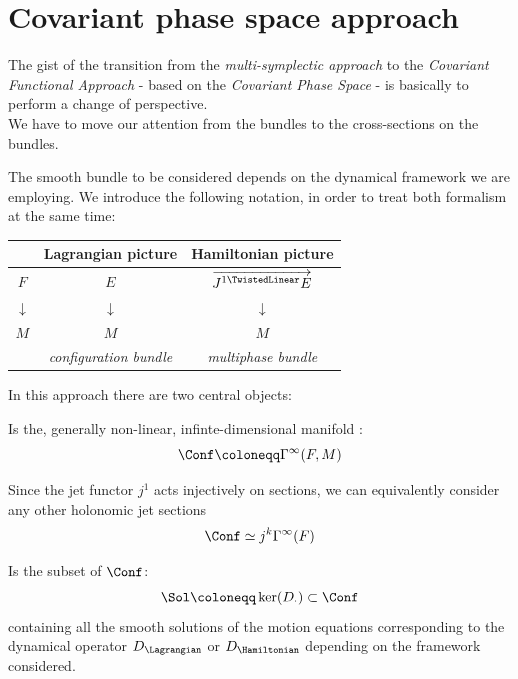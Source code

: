 \documentclass[a4paper,12pt,fleqn]{scrartcl}  %
\renewcommand{\LinDualJet}{ \overrightarrow{J^{1 \TwistedLinear}E} }
\begin{document}
\clearpage \newpage
\section{Covariant phase space approach}
The gist of the transition from the \emph{multi-symplectic approach} to the \emph{Covariant Functional Approach} - based on the \emph{Covariant Phase Space} - is basically to perform a change of perspective.\\
We have to move our attention from the bundles to the cross-sections on the bundles.

The smooth bundle to be considered depends on the dynamical framework we are employing.
We introduce the following notation, in order to treat both formalism at the same time:
\begin{notation}
	\begin{center}
		\begin{tabular}{|c|c|c|}
			\hline
			 & Lagrangian picture & Hamiltonian picture \\
			\hline
			$F$		&	$E$		&	$\LinDualJet$	\\
			$\downarrow$ & $\downarrow$ & $\downarrow$ \\
			$M$ & $M$ & $M$ \\
			    & \emph{configuration bundle} & \emph{multiphase bundle} \\
			\hline
		\end{tabular}
	\end{center}
\end{notation}


In this approach there are two central objects:

	\begin{definition}\label{Def:ConfSpace}
		Is the, generally non-linear, infinte-dimensional manifold :
		\begin{displaymath}
			\Conf \coloneqq \Gamma^\infty(F,M)
		\end{displaymath}
	\end{definition}
%
	\begin{remark}
		Since the jet functor $j^1$ acts injectively on sections, we can equivalently consider any other holonomic jet sections
		\begin{displaymath}
			\Conf \simeq j^k \Gamma^\infty(F)
		\end{displaymath}
	\end{remark}	
%
	\begin{definition}\label{Def:SolSpace}
		Is the subset of $\Conf$:
		\begin{displaymath}
			\Sol \coloneqq \ker(D_\cdot) \subset \Conf
		\end{displaymath}
		containing all the smooth solutions of the motion equations corresponding to the  dynamical operator $D_\Lagrangian$ or $D_\Hamiltonian$ depending on the framework considered.
	\end{definition}
\end{document}
